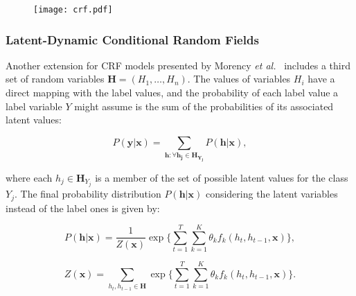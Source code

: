 \documentclass[10pt, conference]{IEEEtran}
\begin{document}
\begin{figure}[t]
\begin{center}
\texttt{[image: crf.pdf]}
\end{center}
  \label{ldcrf-schema}
\end{figure}


\subsubsection{Latent-Dynamic Conditional Random Fields}
\label{bgldcrf}
 

Another extension for CRF models presented by Morency \textit{et al.}~\cite{ldcrf} includes a third set of random variables $ \mathbf{H} = (H_1, \ldots ,H_n)$. The values of variables $H_i$ have a direct mapping with the label values, and the probability of each label value a label variable $Y$ might assume is the sum of the probabilities of its associated latent values:

\begin{equation}
\label{ldcrf} 
P(\mathbf{y}|\mathbf{x}) = 
\sum_{\mathbf{\textbf{h}: \forall h_j \in \mathbf{H}_{Y_j}}}
P(\textbf{h}|\textbf{x}),
\end{equation}

\noindent where each $ h_j \in \mathbf{H}_{Y_j}$ is a member of the set of possible latent values for the class $Y_j$. The final probability distribution $P(\textbf{h}|\textbf{x})$ considering the latent variables instead of the label ones is given by:

\begin{equation}
\label{ldcrfeq} 
P(\mathbf{h}|\mathbf{x}) = 
\frac{1}{Z(\mathbf{x})}
\exp
\Bigg\{\sum_{t=1}^T \sum_{k=1}^K \theta_kf_k(h_t,h_{t-1},\mathbf{x})\Bigg\},
\end{equation}

\begin{equation}
\label{partitionldcrf} 
Z(\mathbf{x}) = \sum_{{h_t,h_{t-1}} \in \mathbf{H}}
\exp
\Bigg\{\sum_{t=1}^T \sum_{k=1}^K \theta_kf_k(h_t,h_{t-1},\mathbf{x})\Bigg\}.
\end{equation}
\end{document}
